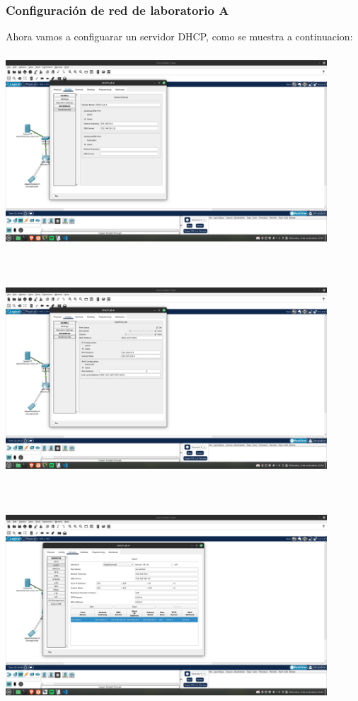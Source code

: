\documentclass[14pt]{book}
\begin{document}
{\color{red} \subsubsection*{\textbf{Configuración de red de laboratorio A}}}
\vspace{1em}

Ahora vamos a configuarar un servidor DHCP, como se muestra a continuacion:\\

\includegraphics[width=12cm, height=8cm]{images/dhcp1.png}

\includegraphics[width=12cm, height=8cm]{images/dhcp2.png}

\includegraphics[width=12cm, height=8cm]{images/dhcp3.png}\\
\end{document}
